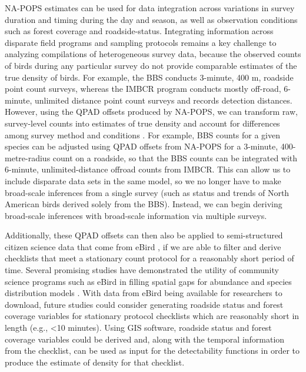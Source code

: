 \par NA-POPS estimates can be used for data integration across variations in survey duration and timing during the day and season, as well as observation conditions such as forest coverage and roadside-status. Integrating information across disparate field programs and sampling protocols remains a key challenge to analyzing compilations of heterogeneous survey data, because the observed counts of birds during any particular survey do not provide comparable estimates of the true density of birds. For example, the BBS conducts 3-minute, 400 m, roadside point count surveys, whereas the IMBCR program conducts mostly off-road, 6-minute, unlimited distance point count surveys and records detection distances. However, using the QPAD offsets produced by NA-POPS, we can transform raw, survey-level counts into estimates of true density and account for differences among survey method and conditions \citep{stralberg_projecting_2015, solymos_lessons_2020}. For example, BBS counts for a given species can be adjusted using QPAD offsets from NA-POPS for a 3-minute, 400-metre-radius count on a roadside, so that the BBS counts can be integrated with 6-minute, unlimited-distance offroad counts from IMBCR. This can allow us to include disparate data sets in the same model, so we no longer have to make broad-scale inferences from a single survey (such as status and trends of North American birds derived solely from the BBS). Instead, we can begin deriving broad-scale inferences with broad-scale information via multiple surveys. 

\par Additionally, these QPAD offsets can then also be applied to semi-structured citizen science data that come from eBird \citep{sullivan_ebird_2014}, if we are able to filter and derive checklists that meet a stationary count protocol for a reasonably short period of time. Several promising studies have demonstrated the utility of community science programs such as eBird in filling spatial gaps for abundance and species distribution models \citep{pacifici_integrating_2017, robinson_integrating_2020, joseph_data_2021}. With data from eBird being available for researchers to download, future studies could consider generating roadside status and forest coverage variables for stationary protocol checklists which are reasonably short in length (e.g., <10 minutes). Using GIS software, roadside status and forest coverage variables could be derived and, along with the temporal information from the checklist, can be used as input for the detectability functions in order to produce the estimate of density for that checklist. 


